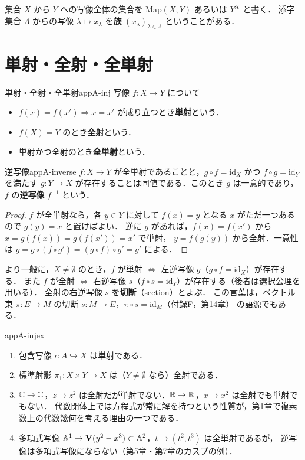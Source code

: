 集合 $X$ から $Y$ への写像全体の集合を $\mathrm{Map}(X,Y)$ あるいは $Y^X$ と書く．
添字集合 $\Lambda$ からの写像 $\lambda\mapsto x_\lambda$ を\textbf{族} $(x_\lambda)_{\lambda\in\Lambda}$ ということがある．

\section{単射・全射・全単射}

\begin{mydef}{単射・全射・全単射}{appA-inj}
写像 $f\colon X\to Y$ について
\begin{itemize}
\item $f(x)=f(x')\Rightarrow x=x'$ が成り立つとき\textbf{単射}という．
\item $f(X)=Y$ のとき\textbf{全射}という．
\item 単射かつ全射のとき\textbf{全単射}という．
\end{itemize}
\end{mydef}

\begin{myprop}{逆写像}{appA-inverse}
$f\colon X\to Y$ が全単射であることと，$g\circ f=\mathrm{id}_X$ かつ $f\circ g=\mathrm{id}_Y$ を満たす
$g\colon Y\to X$ が存在することは同値である．このとき $g$ は一意的であり，$f$ の\textbf{逆写像} $f^{-1}$ という．
\end{myprop}
\begin{proof}
$f$ が全単射なら，各 $y\in Y$ に対して $f(x)=y$ となる $x$ がただ一つあるので $g(y)=x$ と置けばよい．
逆に $g$ があれば，$f(x)=f(x')$ から $x=g(f(x))=g(f(x'))=x'$ で単射，
$y=f(g(y))$ から全射．一意性は $g=g\circ(f\circ g')=(g\circ f)\circ g'=g'$ による．
\end{proof}

より一般に，$X\ne\emptyset$ のとき，$f$ が単射 $\iff$ 左逆写像 $g$（$g\circ f=\mathrm{id}_X$）が存在する．
また $f$ が全射 $\iff$ 右逆写像 $s$（$f\circ s=\mathrm{id}_Y$）が存在する（後者は選択公理を用いる）．
全射の右逆写像 $s$ を\textbf{切断}（section）とよぶ．
この言葉は，ベクトル束 $\pi\colon E\to M$ の切断 $s\colon M\to E$，$\pi\circ s=\mathrm{id}_M$（付録F，第14章）
の語源でもある．

\begin{myex}{}{appA-injex}
\begin{enumerate}
\item 包含写像 $\iota\colon A\hookrightarrow X$ は単射である．
\item 標準射影 $\pi_1\colon X\times Y\to X$ は（$Y\ne\emptyset$ なら）全射である．
\item $\mathbb{C}\to\mathbb{C}$，$z\mapsto z^2$ は全射だが単射でない．$\mathbb{R}\to\mathbb{R}$，$x\mapsto x^2$ は全射でも単射でもない．
代数閉体上では方程式が常に解を持つという性質が，第1章で複素数上の代数幾何を考える理由の一つである．
\item 多項式写像 $\mathbb{A}^1\to\mathbf{V}(y^2-x^3)\subset\mathbb{A}^2$，$t\mapsto(t^2,t^3)$ は全単射であるが，
逆写像は多項式写像にならない（第5章・第7章のカスプの例）．
\end{enumerate}
\end{myex}

